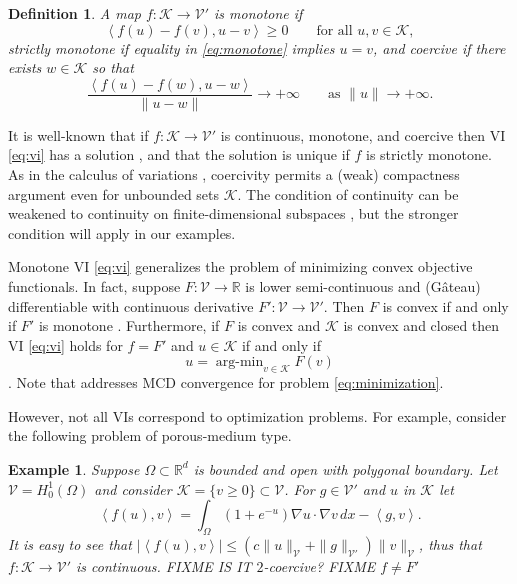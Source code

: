 \documentclass[letterpaper,final,12pt,reqno]{amsart}
\theoremstyle{cstyle}
\theoremstyle{dstyle}
\newtheorem{definition}[theorem]{Definition}
\newtheorem{example}[theorem]{Example}
\numberwithin{equation}{section}
\numberwithin{figure}{section}
\numberwithin{table}{section}
\numberwithin{theorem}{section}
\newcommand{\RR}{\mathbb{R}}
\newcommand{\grad}{\nabla}
\newcommand{\cK}{\mathcal{K}}
\newcommand{\cV}{\mathcal{V}}
\newcommand{\ip}[2]{\left<#1,#2\right>}
\begin{document}
\begin{definition} A map $f:\cK \to \cV'$ is \emph{monotone} if
\begin{equation}
\ip{f(u)-f(v)}{u-v} \ge 0 \qquad \text{for all } u,v \in \cK, \label{eq:monotone}
\end{equation}
\emph{strictly monotone} if equality in \eqref{eq:monotone} implies $u=v$, and \emph{coercive} if there exists $w \in \cK$ so that
\begin{equation}
\frac{\ip{f(u)-f(w)}{u-w}}{\|u-w\|} \to +\infty \qquad \text{as } \|u\|\to +\infty.
\end{equation}
\end{definition}

It is well-known that if $f:\cK \to \cV'$ is continuous, monotone, and coercive then VI \eqref{eq:vi} has a solution \cite[Corollary III.1.8]{KinderlehrerStampacchia1980}, and that the solution is unique if $f$ is strictly monotone.  As in the calculus of variations \cite{Evans2010}, coercivity permits a (weak) compactness argument even for unbounded sets $\cK$.  The condition of continuity can be weakened to continuity on finite-dimensional subspaces \cite{KinderlehrerStampacchia1980}, but the stronger condition will apply in our examples.

Monotone VI \eqref{eq:vi} generalizes the problem of minimizing convex objective functionals.  In fact, suppose $F:\cV \to \RR$ is lower semi-continuous and (G\^ateau) differentiable with continuous derivative $F':\cV \to \cV'$.  Then $F$ is convex if and only if $F'$ is monotone \cite[Proposition I.5.5]{EkelandTemam1976}.  Furthermore, if $F$ is convex and $\cK$ is convex and closed then VI \eqref{eq:vi} holds for $f=F'$ and $u\in \cK$ if and only if
\begin{equation}
u = \operatorname{arg-min}_{v\in\cK} F(v) \label{eq:minimization}
\end{equation}
\cite[Proposition II.2.1]{EkelandTemam1976}.  Note that \cite{Tai2003} addresses MCD convergence for problem \eqref{eq:minimization}.

However, not all VIs correspond to optimization problems.  For example, consider the following problem of porous-medium type.

\begin{example}  Suppose $\Omega \subset \RR^d$ is bounded and open with polygonal boundary.  Let $\cV = H_0^1(\Omega)$ and consider $\cK = \{v\ge 0\} \subset \cV$.  For $g\in \cV'$ and $u$ in $\cK$ let
\begin{equation}
\ip{f(u)}{v} = \int_\Omega (1+e^{-u}) \grad u \cdot \grad v\,dx - \ip{g}{v}. \label{eq:nongradientexample}
\end{equation}
It is easy to see that $|\ip{f(u)}{v}| \le (c \|u\|_{\cV} + \|g\|_{\cV'}) \|v\|_{\cV}$, thus that $f:\cK \to \cV'$ is continuous.  FIXME IS IT $2$-coercive?  FIXME $f\ne F'$
\end{example}
\end{document}
